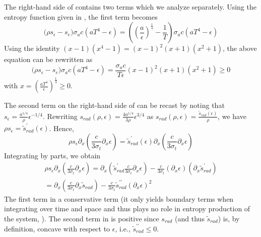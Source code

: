 \documentclass{mc2015}
\begin{document}
The right-hand side of  contains two terms which we analyze separately. Using the entropy function given in , the first term becomes
\begin{equation} 
\Big( \rho s_\epsilon -s_e \Big)  \sigma_a c \left( a T^4 - \epsilon \right) 
= \left( \left( \frac{a}{\epsilon}\right)^\frac{1}{4} - \frac{1}{T} \right)   \sigma_a c \left( a T^4 - \epsilon \right) 
\end{equation}
Using the identity $(x-1)(x^4-1) = (x-1)^2(x+1)(x^2+1)$, the above equation can be rewritten as
\begin{equation} 
\Big( \rho s_\epsilon -s_e \Big)  \sigma_a c \left( a T^4 - \epsilon \right) 
= \frac{\sigma_a c}{T \epsilon}  (x-1)^2(x+1)(x^2+1) \geq 0
\end{equation}
with $x=  \left(\frac{aT^4}{\epsilon}\right)^\frac{1}{4} \geq 0.$

The second term on the right-hand side of  can be recast by noting that $s_\epsilon = \frac{a^{1/4}}{\rho} \epsilon^{-1/4}$. Rewriting $s_{rad}(\rho, \epsilon) = \frac{4a^{1/4}}{3\rho} \epsilon^{3/4}$ as  $s_{rad}(\rho, \epsilon) = \frac{\tilde{s}_{rad}(\epsilon)}{\rho}$, we have
$ \rho s_\epsilon = \tilde{s}^\prime_{rad}(\epsilon)$. Hence, 
\begin{equation}
\rho s_\epsilon \partial_x \left( \frac{c}{3 \sigma_t} \partial_x \epsilon \right) 
=
 \tilde{s}^\prime_{rad}(\epsilon) \partial_x \left( \frac{c}{3 \sigma_t} \partial_x \epsilon \right) 
\end{equation}
%
Integrating by parts, we obtain
%
\begin{multline} \label{eq:final_form_second_term}
\rho s_\epsilon \partial_x \left( \frac{c}{3 \sigma_t} \partial_x \epsilon \right) 
=
 \partial_x \left(  \tilde{s}^\prime_{rad}  \frac{c}{3 \sigma_t} \partial_x \epsilon \right) 
-
\frac{c}{3 \sigma_t} \left(  \partial_x \epsilon \right)  \left( \partial_x \tilde{s}^\prime_{rad}  \right) \\
=
 \partial_x \left(   \frac{c}{3 \sigma_t} \partial_x \tilde{s}_{rad}  \right) 
-
\frac{c}{3 \sigma_t} \tilde{s}^{\prime\prime}_{rad}  \left(  \partial_x \epsilon \right)^2   \qquad  \qquad  \qquad \ 
\end{multline}
%
The first term in  a conservative term (it only yields boundary terms when integrating over time and space and thus plays no role in entropy production of the system, \cite{Leveque}). The second term  in  is positive 
since $s_{rad}$ (and thus $\tilde{s}_{rad}$) is, by definition, concave with respect to $\epsilon$, i.e., $\tilde{s}^{\prime\prime}_{rad} \leq 0$.
\end{document}
